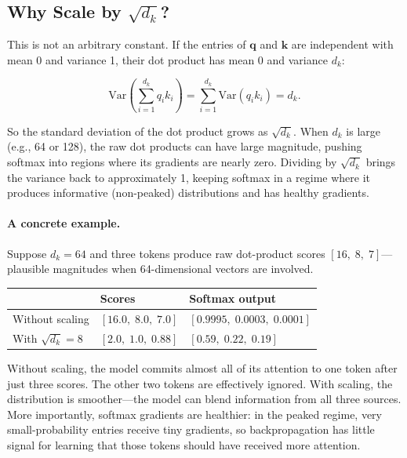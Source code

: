 \subsection[Why Scale by sqrt(d\_k)?]{Why Scale by $\sqrt{d_k}$?}

This is not an arbitrary constant. If the entries of $\mathbf{q}$ and $\mathbf{k}$ are independent with mean 0 and variance 1, their dot product has mean 0 and variance $d_k$:

\[
\text{Var}\!\left(\sum_{i=1}^{d_k} q_i k_i\right) = \sum_{i=1}^{d_k} \text{Var}(q_i k_i) = d_k.
\]

So the standard deviation of the dot product grows as $\sqrt{d_k}$. When $d_k$ is large (e.g., 64 or 128), the raw dot products can have large magnitude, pushing softmax into regions where its gradients are nearly zero. Dividing by $\sqrt{d_k}$ brings the variance back to approximately 1, keeping softmax in a regime where it produces informative (non-peaked) distributions and has healthy gradients.

\paragraph{A concrete example.}  Suppose $d_k = 64$ and three tokens produce raw dot-product scores $[16,\; 8,\; 7]$---plausible magnitudes when 64-dimensional vectors are involved.

\medskip
\begin{center}
\begin{tabular}{lll}
\toprule
& \textbf{Scores} & \textbf{Softmax output} \\
\midrule
Without scaling & $[16.0,\; 8.0,\; 7.0]$ & $[0.9995,\; 0.0003,\; 0.0001]$ \\
With $\sqrt{d_k} = 8$ & $[2.0,\; 1.0,\; 0.88]$ & $[0.59,\; 0.22,\; 0.19]$ \\
\bottomrule
\end{tabular}
\end{center}
\medskip

Without scaling, the model commits almost all of its attention to one token after just three scores. The other two tokens are effectively ignored. With scaling, the distribution is smoother---the model can blend information from all three sources. More importantly, softmax gradients are healthier: in the peaked regime, very small-probability entries receive tiny gradients, so backpropagation has little signal for learning that those tokens should have received more attention.

